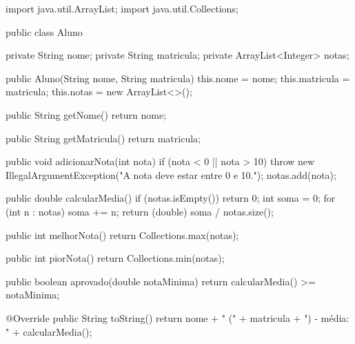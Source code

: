\documentclass[11pt,a4paper]{article}
\begin{document}
\begin{javacode}
import java.util.ArrayList;
import java.util.Collections;

public class Aluno {
    private String nome;
    private String matricula;
    private ArrayList<Integer> notas;

    public Aluno(String nome, String matricula) {
        this.nome = nome;
        this.matricula = matricula;
        this.notas = new ArrayList<>();
    }

    public String getNome() {
        return nome;
    }

    public String getMatricula() {
        return matricula;
    }

    public void adicionarNota(int nota) {
        if (nota < 0 || nota > 10) {
            throw new IllegalArgumentException("A nota deve estar entre 0 e 10.");
        }
        notas.add(nota);
    }

    public double calcularMedia() {
        if (notas.isEmpty()) return 0;
        int soma = 0;
        for (int n : notas) soma += n;
        return (double) soma / notas.size();
    }

    public int melhorNota() {
        return Collections.max(notas);
    }

    public int piorNota() {
        return Collections.min(notas);
    }

    public boolean aprovado(double notaMinima) {
        return calcularMedia() >= notaMinima;
    }

    @Override
    public String toString() {
        return nome + " (" + matricula + ") - média: " + calcularMedia();
    }
}
\end{javacode}
\end{document}
